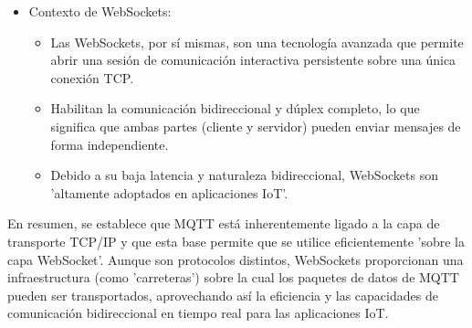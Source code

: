 \documentclass{report}
\begin{document}
\begin{itemize}
    \item Contexto de WebSockets:
        \begin{itemize}
            \item Las WebSockets, por sí mismas, son una tecnología avanzada que permite abrir una sesión de comunicación interactiva 
            persistente sobre una única conexión TCP.
            \item Habilitan la comunicación bidireccional y dúplex completo, lo que significa que ambas partes (cliente y servidor) 
            pueden enviar mensajes de forma independiente.
            \item Debido a su baja latencia y naturaleza bidireccional, WebSockets son 'altamente adoptados en aplicaciones IoT'.
        \end{itemize}
\end{itemize}
En resumen, se  establece que MQTT está inherentemente ligado a la capa de transporte TCP/IP y que esta base permite 
que se utilice eficientemente 'sobre la capa WebSocket'. Aunque son protocolos distintos, WebSockets proporcionan una 
infraestructura (como 'carreteras') sobre la cual los paquetes de datos de MQTT pueden ser transportados, aprovechando así la 
eficiencia y las capacidades de comunicación bidireccional en tiempo real para las aplicaciones IoT.
\end{document}
